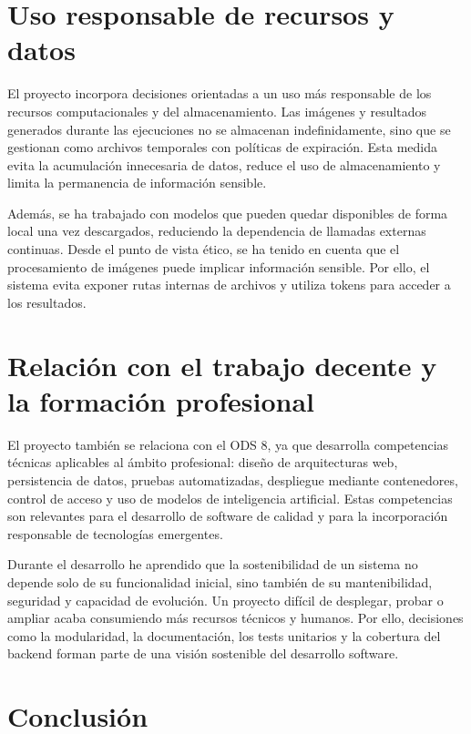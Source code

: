 \section{Uso responsable de recursos y datos}

El proyecto incorpora decisiones orientadas a un uso más responsable de los recursos computacionales y del almacenamiento. Las imágenes y resultados generados durante las ejecuciones no se almacenan indefinidamente, sino que se gestionan como archivos temporales con políticas de expiración. Esta medida evita la acumulación innecesaria de datos, reduce el uso de almacenamiento y limita la permanencia de información sensible.

Además, se ha trabajado con modelos que pueden quedar disponibles de forma local una vez descargados, reduciendo la dependencia de llamadas externas continuas. Desde el punto de vista ético, se ha tenido en cuenta que el procesamiento de imágenes puede implicar información sensible. Por ello, el sistema evita exponer rutas internas de archivos y utiliza tokens para acceder a los resultados.

\section{Relación con el trabajo decente y la formación profesional}

El proyecto también se relaciona con el ODS 8, ya que desarrolla competencias técnicas aplicables al ámbito profesional: diseño de arquitecturas web, persistencia de datos, pruebas automatizadas, despliegue mediante contenedores, control de acceso y uso de modelos de inteligencia artificial. Estas competencias son relevantes para el desarrollo de software de calidad y para la incorporación responsable de tecnologías emergentes.

Durante el desarrollo he aprendido que la sostenibilidad de un sistema no depende solo de su funcionalidad inicial, sino también de su mantenibilidad, seguridad y capacidad de evolución. Un proyecto difícil de desplegar, probar o ampliar acaba consumiendo más recursos técnicos y humanos. Por ello, decisiones como la modularidad, la documentación, los tests unitarios y la cobertura del backend forman parte de una visión sostenible del desarrollo software.

\section{Conclusión}

